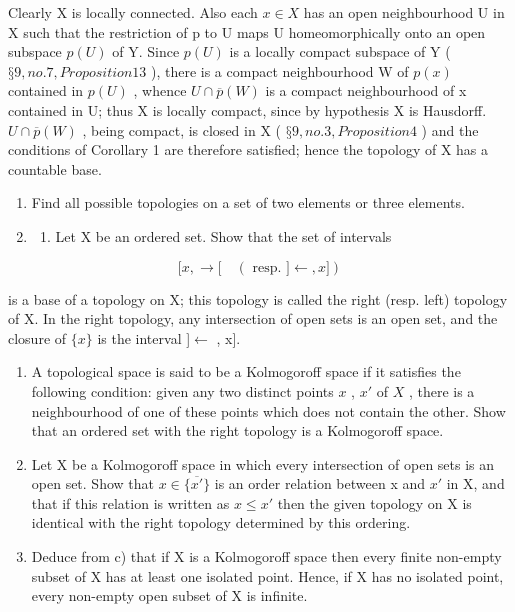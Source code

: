 Clearly X is locally connected. Also each \(x \in X\) has an open neighbourhood U in X such that the restriction of p to U maps U homeomorphically onto an open subspace \(p(U)\) of Y. Since \(p(U)\) is a locally compact subspace of Y ( \(§ 9, no. 7, Proposition 13\) ), there is a compact neighbourhood W of \(p(x)\) contained in \(p(U)\) , whence \(U \cap \overline{p}(W)\) is a compact neighbourhood of x contained in U; thus X is locally compact, since by hypothesis X is Hausdorff. \(U \cap \overline{p}(W)\) , being compact, is closed in X ( \(§ 9, no. 3, Proposition 4\) ) and the conditions of Corollary 1 are therefore satisfied; hence the topology of X has a countable base.

\BourbakiExercises
\BourbakiExerciseGroup

\begin{enumerate}
\def\labelenumi{\arabic{enumi})}
\item
  Find all possible topologies on a set of two elements or three elements.
\item
  \begin{enumerate}
  \def\labelenumii{\alph{enumii})}
  \tightlist
  \item
    Let X be an ordered set. Show that the set of intervals
  \end{enumerate}
\end{enumerate}

\[
[ x, \rightarrow [ \quad (\text { resp. } ] \leftarrow , x ])
\]

is a base of a topology on X; this topology is called the right (resp. left) topology of X. In the right topology, any intersection of open sets is an open set, and the closure of \(\{x\}\) is the interval {]}\(\leftarrow\) , x{]}.

\begin{enumerate}
\def\labelenumi{\alph{enumi})}
\setcounter{enumi}{1}
\item
  A topological space is said to be a Kolmogoroff space if it satisfies the following condition: given any two distinct points \(x\) , \(x'\) of \(X\) , there is a neighbourhood of one of these points which does not contain the other. Show that an ordered set with the right topology is a Kolmogoroff space.
\item
  Let X be a Kolmogoroff space in which every intersection of open sets is an open set. Show that \(x \in \overline{\{x'\}}\) is an order relation between x and \(x'\) in X, and that if this relation is written as \(x \leqslant x'\) then the given topology on X is identical with the right topology determined by this ordering.
\item
  Deduce from c) that if X is a Kolmogoroff space then every finite non-empty subset of X has at least one isolated point. Hence, if X has no isolated point, every non-empty open subset of X is infinite.
\end{enumerate}

